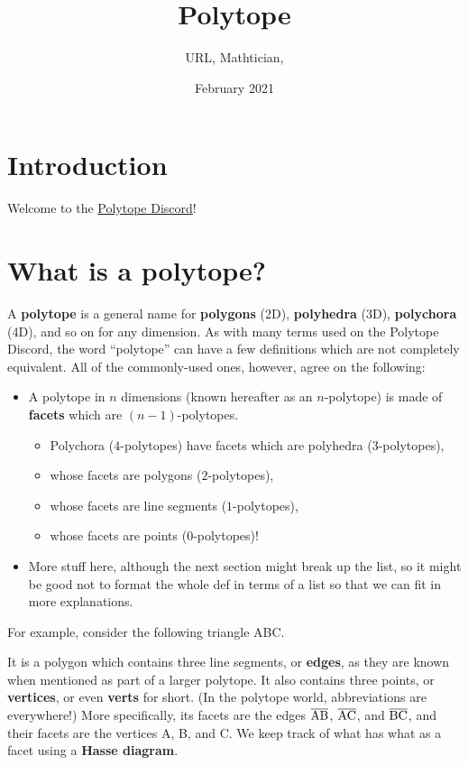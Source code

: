 \documentclass{article}
\title{Polytope}
\author{URL, Mathtician, }
\date{February 2021}
\begin{document}
\maketitle

\section{Introduction}
Welcome to the \href{https://discord.gg/invite/zMRu7T4}{Polytope Discord}!

\section{What is a polytope?}
A \textbf{polytope} is a general name for
\textbf{polygons} (2D), \textbf{polyhedra} (3D), \textbf{polychora} (4D),
and so on for any dimension.
As with many terms used on the Polytope Discord,
the word ``polytope'' can have a few definitions which are not completely equivalent.
All of the commonly-used ones, however, agree on the following:
\begin{itemize}
\item
  A polytope in $n$ dimensions (known hereafter as an $n$-polytope)
  is made of \textbf{facets} which are $(n-1)$-polytopes.
  \begin{itemize}
  \item Polychora ($4$-polytopes) have facets which are polyhedra ($3$-polytopes),
  \item whose facets are polygons ($2$-polytopes),
  \item whose facets are line segments ($1$-polytopes),
  \item whose facets are points ($0$-polytopes)!
  \end{itemize}
\item
  More stuff here, although the next section might break up the list,
  so it might be good not to format the whole def in terms of a list
  so that we can fit in more explanations.
\end{itemize}

For example, consider the following triangle ABC.

\begin{center}
\end{center}

It is a polygon which contains three line segments,
or \textbf{edges}, as they are known
when mentioned as part of a larger polytope.
It also contains three points, or \textbf{vertices},
or even \textbf{verts} for short.
(In the polytope world, abbreviations are everywhere!)
More specifically, its facets are the edges
$\overline{\rm AB}$, $\overline{\rm AC}$, and $\overline{\rm BC}$,
and their facets are the vertices A, B, and C.
We keep track of what has what as a facet using a \textbf{Hasse diagram}.
\end{document}
